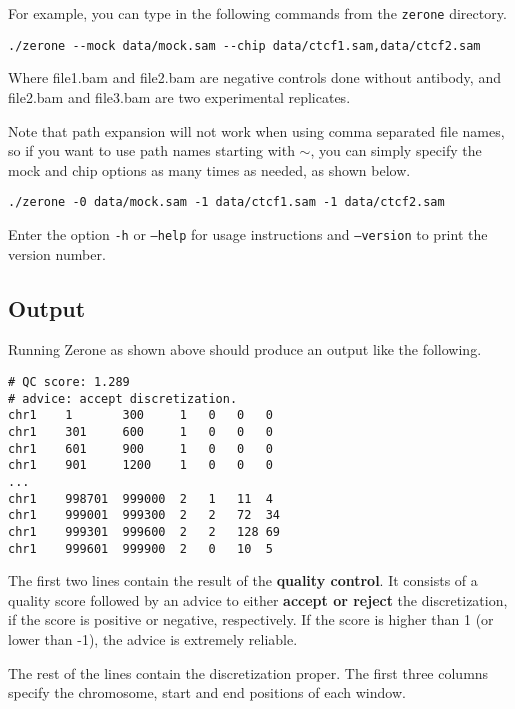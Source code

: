 \documentclass[12pt]{article}
\begin{document}
For example, you can type in the following commands from the \texttt{zerone}
directory.

\begin{verbatim}
./zerone --mock data/mock.sam --chip data/ctcf1.sam,data/ctcf2.sam
\end{verbatim}

Where file1.bam and file2.bam are negative controls done without antibody,
and file2.bam and file3.bam are two experimental replicates.

Note that path expansion will not work when using comma separated file names,
so if you want to use path names starting with $\sim$, you can simply
specify the mock and chip options as many times as needed, as shown below.

\begin{verbatim}
./zerone -0 data/mock.sam -1 data/ctcf1.sam -1 data/ctcf2.sam
\end{verbatim}

Enter the option \texttt{-h} or \texttt{--help} for usage instructions and
\texttt{--version} to print the version number.

\pagebreak

\subsection{Output}

Running Zerone as shown above should produce an output like the following.

\begin{verbatim}
# QC score: 1.289
# advice: accept discretization.
chr1    1       300     1   0   0   0
chr1    301     600     1   0   0   0
chr1    601     900     1   0   0   0
chr1    901     1200    1   0   0   0
...
chr1    998701  999000  2   1   11  4
chr1    999001  999300  2   2   72  34
chr1    999301  999600  2   2   128 69
chr1    999601  999900  2   0   10  5
\end{verbatim}

\begin{mdframed}
The first two lines contain the result of the \textbf{quality control}.
It consists of a quality score followed by an advice to either
\textbf{accept or reject} the discretization, if the score is positive or
negative, respectively. If the score is higher than 1 (or lower than -1), the
advice is extremely reliable.
\end{mdframed}

The rest of the lines contain the discretization proper. The first three columns
specify the chromosome, start and end positions of each window.
\end{document}
